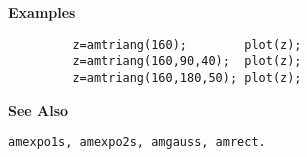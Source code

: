 {\bf \large \sf Examples}
\begin{verbatim}
         z=amtriang(160);        plot(z);
         z=amtriang(160,90,40);  plot(z);
         z=amtriang(160,180,50); plot(z);
\end{verbatim}
\vspace*{.5cm}


{\bf \large \sf See Also}\\
\hspace*{1.5cm}
\begin{minipage}[t]{13.5cm}
\begin{verbatim}
amexpo1s, amexpo2s, amgauss, amrect.
\end{verbatim}
\end{minipage}



